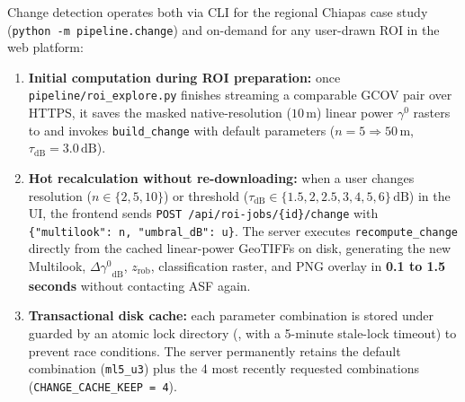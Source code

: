 \documentclass[11pt,a4paper]{article}
\newcommand{\src}[1]{\nolinkurl{#1}}
\newcommand{\unit}[1]{\mathrm{#1}}
\newcommand{\gz}{\ensuremath{\gamma^{0}}}
\begin{document}
Change detection operates both via CLI for the regional Chiapas case study (\texttt{python -m pipeline.change}) and on-demand for any user-drawn ROI in the web platform:
\begin{enumerate}
  \item \textbf{Initial computation during ROI preparation:} once \src{pipeline/roi_explore.py} finishes streaming a comparable GCOV pair over HTTPS, it saves the masked native-resolution ($10\,\unit{m}$) linear power $\gz$ rasters to  and invokes \texttt{build\_change} with default parameters ($n=5 \Rightarrow 50\,\unit{m}$, $\tau_{\mathrm{dB}} = 3.0\,\unit{dB}$).
  \item \textbf{Hot recalculation without re-downloading:} when a user changes resolution ($n \in \{2, 5, 10\}$) or threshold ($\tau_{\mathrm{dB}} \in \{1.5, 2, 2.5, 3, 4, 5, 6\}\,\unit{dB}$) in the UI, the frontend sends \texttt{POST /api/roi-jobs/\{id\}/change} with \texttt{\{"multilook": n, "umbral\_dB": u\}}. The server executes \texttt{recompute\_change} directly from the cached linear-power GeoTIFFs on disk, generating the new Multilook, $\Delta\gz_{\mathrm{dB}}$, $z_{\mathrm{rob}}$, classification raster, and PNG overlay in \textbf{0.1 to 1.5 seconds} without contacting ASF again.
  \item \textbf{Transactional disk cache:} each parameter combination is stored under  guarded by an atomic lock directory (, with a 5-minute stale-lock timeout) to prevent race conditions. The server permanently retains the default combination (\texttt{ml5\_u3}) plus the 4 most recently requested combinations (\texttt{CHANGE\_CACHE\_KEEP = 4}).
\end{enumerate}
\end{document}
